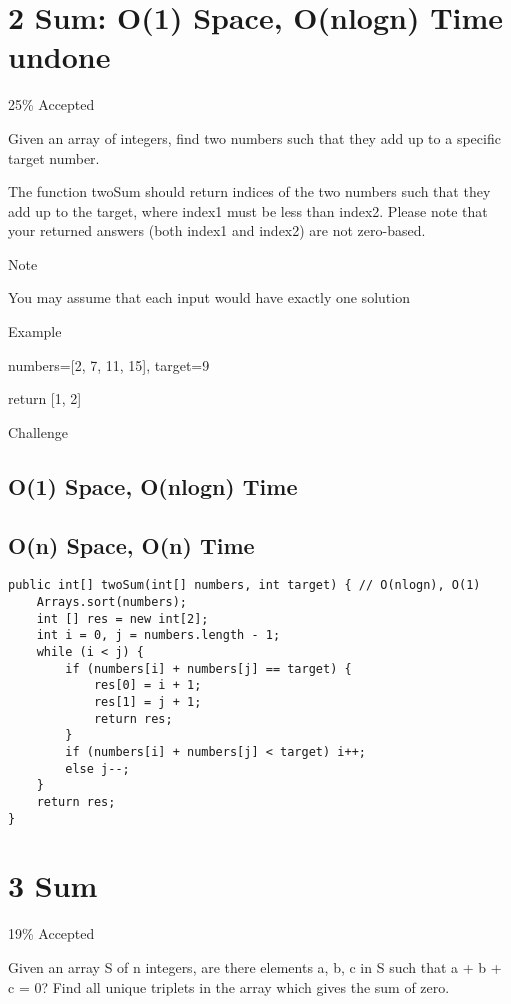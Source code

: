 \documentclass[12pt]{book}
\begin{document}
\chapter{2 Sum: O(1) Space, O(nlogn) Time undone}
\label{sec-2}

25\% Accepted

Given an array of integers, find two numbers such that they add up to a specific target number.

The function twoSum should return indices of the two numbers such that they add up to the target, where index1 must be less than index2. Please note that your returned answers (both index1 and index2) are not zero-based.

Note

You may assume that each input would have exactly one solution

Example

numbers=[2, 7, 11, 15], target=9

return [1, 2]

Challenge

\section{O(1) Space, O(nlogn) Time}
\label{sec-2-1}

\section{O(n) Space, O(n) Time}
\label{sec-2-2}
\lstset{language=java,label= ,caption= ,numbers=none}
\begin{lstlisting}
public int[] twoSum(int[] numbers, int target) { // O(nlogn), O(1)
    Arrays.sort(numbers);
    int [] res = new int[2];
    int i = 0, j = numbers.length - 1;
    while (i < j) {
        if (numbers[i] + numbers[j] == target) {
            res[0] = i + 1;
            res[1] = j + 1;
            return res;
        }
        if (numbers[i] + numbers[j] < target) i++;
        else j--;
    }
    return res;
}
\end{lstlisting}

\chapter{3 Sum}
\label{sec-3}

19\% Accepted

Given an array S of n integers, are there elements a, b, c in S such that a + b + c = 0? Find all unique triplets in the array which gives the sum of zero.
\end{document}
